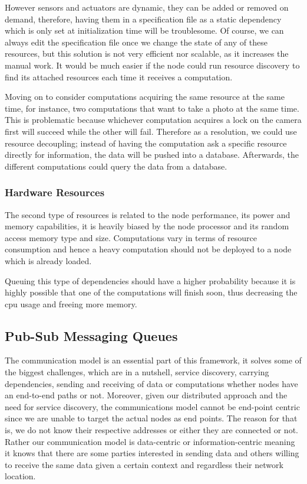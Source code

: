   
  However sensors and actuators are dynamic, they can be added or removed on demand, therefore, having them in a specification file as a static dependency which is only set at initialization time will be troublesome. Of course, we can always edit the specification file once we change the state of any of these resources, but this solution is not very efficient nor scalable, as it increases the manual work. It would be much easier if the node could run resource discovery to find its attached resources each time it receives a computation.
  
  Moving on to consider computations acquiring the same resource at the same time, for instance, two computations that want to take a photo at the same time. This is problematic because whichever computation acquires a lock on the camera first will succeed while the other will fail. Therefore as a resolution, we could use resource decoupling; instead of having the computation ask a specific resource directly for information, the  data will be pushed into a database. Afterwards, the different computations could query the data from a database.
  
  

\subsubsection{Hardware Resources }

The second type of resources is related to the node performance, its power and memory capabilities, it is heavily biased by the  node processor  and its random access memory type and size. Computations vary in terms of resource consumption and hence a heavy computation should not be deployed to a node which is already loaded. 

Queuing this type of dependencies should have a higher probability because it is highly possible that one of the computations will finish soon, thus decreasing the cpu usage and freeing more memory.







\subsection{Pub-Sub Messaging Queues}\label{subsec:pub-sub}

The communication model is an essential part of this framework, it solves some of the biggest challenges, which are in a nutshell, service discovery, carrying dependencies, sending and receiving of data or computations whether nodes have an end-to-end paths or not. Moreover, given our distributed approach and the need for service discovery, the communications model cannot be  end-point centric since we are unable to target the actual nodes as end points. The reason for that is, we do not know their respective addresses or either they are connected or not. Rather our communication model is data-centric or information-centric meaning it knows that there are some parties interested in sending data and others willing to receive the same data given a certain context and regardless their network location. 

